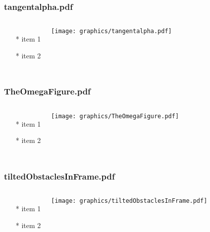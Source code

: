 \documentclass{beamer}
\begin{document}
\begin{frame} \frametitle{tangentalpha.pdf}
    \begin{columns}[c]
        \begin{itemize}
            \item[*] item 1
            \item[*] item 2
        \end{itemize}
        \begin{minipage}{\linewidth}
            \begin{center}
            \texttt{[image: graphics/tangentalpha.pdf]}
            \label{gfx:tangentalpha.pdf}
            \end{center}
        \end{minipage}
    \end{columns}
\end{frame}
\begin{frame} \frametitle{TheOmegaFigure.pdf}
    \begin{columns}[c]
        \begin{itemize}
            \item[*] item 1
            \item[*] item 2
        \end{itemize}
        \begin{minipage}{\linewidth}
            \begin{center}
            \texttt{[image: graphics/TheOmegaFigure.pdf]}
            \label{gfx:TheOmegaFigure.pdf}
            \end{center}
        \end{minipage}
    \end{columns}
\end{frame}
\begin{frame} \frametitle{tiltedObstaclesInFrame.pdf}
    \begin{columns}[c]
        \begin{itemize}
            \item[*] item 1
            \item[*] item 2
        \end{itemize}
        \begin{minipage}{\linewidth}
            \begin{center}
            \texttt{[image: graphics/tiltedObstaclesInFrame.pdf]}
            \label{gfx:tiltedObstaclesInFrame.pdf}
            \end{center}
        \end{minipage}
    \end{columns}
\end{frame}
\end{document}
